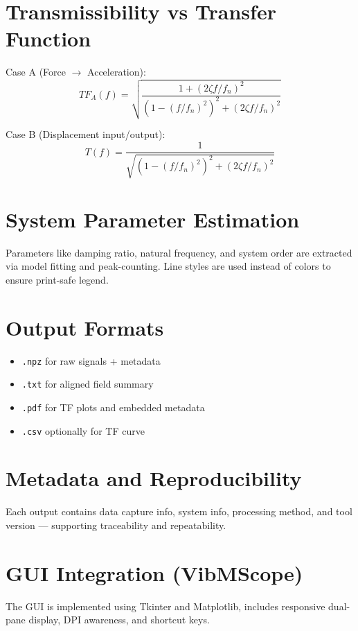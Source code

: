 \documentclass[conference]{IEEEtran}
\begin{document}
\section{Transmissibility vs Transfer Function}
Case A (Force $\rightarrow$ Acceleration):
\begin{equation}
TF_A(f) = \sqrt{\frac{1 + (2\zeta f / f_n)^2}{(1 - (f / f_n)^2)^2 + (2\zeta f / f_n)^2}}
\end{equation}

Case B (Displacement input/output):
\begin{equation}
T(f) = \frac{1}{\sqrt{(1 - (f / f_n)^2)^2 + (2\zeta f / f_n)^2}}
\end{equation}

\section{System Parameter Estimation}
Parameters like damping ratio, natural frequency, and system order are extracted via model fitting and peak-counting. Line styles are used instead of colors to ensure print-safe legend.

\section{Output Formats}
\begin{itemize}
\item \texttt{.npz} for raw signals + metadata
\item \texttt{.txt} for aligned field summary
\item \texttt{.pdf} for TF plots and embedded metadata
\item \texttt{.csv} optionally for TF curve
\end{itemize}

\section{Metadata and Reproducibility}
Each output contains data capture info, system info, processing method, and tool version --- supporting traceability and repeatability.

\section{GUI Integration (VibMScope)}
The GUI is implemented using Tkinter and Matplotlib, includes responsive dual-pane display, DPI awareness, and shortcut keys.
\end{document}

